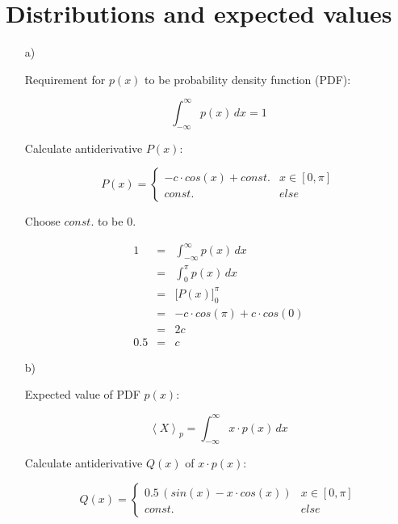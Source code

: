 \documentclass[11pt,a4paper]{article}
\begin{document}
\section{Distributions and expected values}

\begin{enumerate}

\item[a)]

Requirement for $p(x)$ to be probability density function (PDF):

\begin{displaymath}
\int_{-\infty}^{\infty} p(x) \, dx = 1
\end{displaymath}

Calculate antiderivative $P(x)$:

\begin{displaymath}
P(x) = \begin{cases}
-c \cdot cos(x) + const.   & x \in [0, \pi]\\
const.                      & else
\end{cases}
\end{displaymath}

Choose $const.$ to be $0$.

\begin{eqnarray*}
1   &   = & \int_{-\infty}^\infty p(x) \, dx\\
    &   = & \int_0^\pi p(x) \, dx\\
    &   = & \Big[ P(x) \Big]_0^\pi\\
    &   = & -c \cdot cos(\pi) + c \cdot cos(0)\\
    &   = & 2c\\
0.5 &   = & c
\end{eqnarray*}

\item[b)]

Expected value of PDF $p(x)$:

\begin{displaymath}
\left\langle X \right\rangle_p = \int_{-\infty}^\infty x \cdot p(x) \, dx
\end{displaymath}

Calculate antiderivative $Q(x)$ of $x \cdot p(x)$:

\begin{displaymath}
Q(x) = \begin{cases}
0.5 \, (sin(x) - x \cdot cos(x))    & x \in [0, \pi]\\
const.                              & else
\end{cases}
\end{displaymath}


\end{enumerate}
\end{document}
